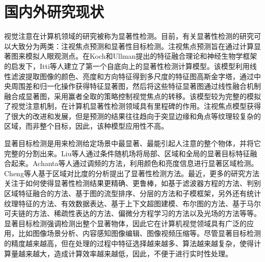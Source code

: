 \section{国内外研究现状}
\label{1_2}

视觉注意在计算机领域的研究被称为显著性检测。目前，有关显著性检测的研究可以大致分为两类：注视焦点预测和显著性目标检测\cite{ChengMingMingCVPR2014BING,LiYinCVPR2014Secrets}。注视焦点预测旨在通过计算显著图来模拟人眼观测点。在Koch和Ullman\cite{Koch1987Shifts}提出的特征融合理论和神经生物学框架的启发下，Itti等人\cite{IttiTPAMI1998Model}建立了第一个自底向上的显著性检测计算模型。该模型利用线性滤波提取图像的颜色、亮度和方向特征得到多尺度的特征图高斯金字塔，通过中央周围差和归一化操作获得特征显著图，然后将这些特征显著图通过线性融合机制融合成显著图，采用赢者全取的策略控制视觉焦点的转移。该模型较为完整的模拟了视觉注意机制，在计算机显著性检测领域具有里程碑的作用。注视焦点模型获得了很大的改进和发展\cite{JuddMIT2012Benchmark,BorjiTIP2013Quantitative,BorjiICCV2013Analysis,BorjiTPAMI2013State,VigCVPR2014Large}，但是预测的结果往往趋向于突显边缘和角点等纹理较复杂的区域，而非整个目标，因此，该种模型应用性不高\cite{ChengMingMingCVPR2014BING}。

显著目标检测是用来检测给定场景中最显著、最能引起人注意的整个物体，并将它完整的分割出来\cite{BorjiECCV2012Salient,LiYinCVPR2014Secrets}。Liu等人\cite{LiuTieCVPR2007Learning}通过条件随机场将局部、区域和全局的显著目标特征融合起来。Achanta等人\cite{AchantaCVPR2009Frequency}通过调频的方法，利用颜色和亮度信息进行显著区域检测。Cheng等人\cite{ChengMingMingCVPR2011Global}基于区域对比度的分析提出了显著性检测方法。最近，更多的研究方法\cite{BorjiECCV2012Salient}关注于如何使得显著性检测结果更精确、更鲁棒，如基于滤波器方程的方法\cite{PerazziCVPR2012filters}、判别区域特征融合的方法\cite{JiangHuaizuCVPR2013Discriminative}、基于图的流型排序\cite{YangChuanCVPR2013Manifold}、分层的方法\cite{YanQiongCVPR2013Hierarchical}和子模框架\cite{JiangZhuolinCVPR2013Submodular}，另外还有统计纹理特征的方法\cite{ScharfenbergerCVPR2013Statistical}、有效数据表达\cite{ChengMingMingICCV2013Efficient}、基于上下文超图建模\cite{LiXiICCV2013Contextual}、布尔图的方法\cite{ZhangJianmingICCV2013Boolean}、基于马尔可夫链的方法\cite{JiangBowenICCV2013Markov}、稀疏性表达的方法\cite{LiXiaohuiICCV2013Dense}、偏微分方程学习的方法\cite{LiuRishengCVPR2014Adaptive}以及光场的方法\cite{LiNianyiCVPR2014Light}等等。显著目标检测强调检测出整个显著物体，因此它在计算机视觉领域具有广泛的应用\cite{BorjiTPAMI2013State}，比如图像场景分析、内容感知图像编辑、图像视频压缩等。尽管显著目标检测的精度越来越高，但在处理的过程中特征选择越来越多、算法越来越复杂，使得计算量越来越大，造成计算效率越来越低，因此，不便于进行实时性处理。


